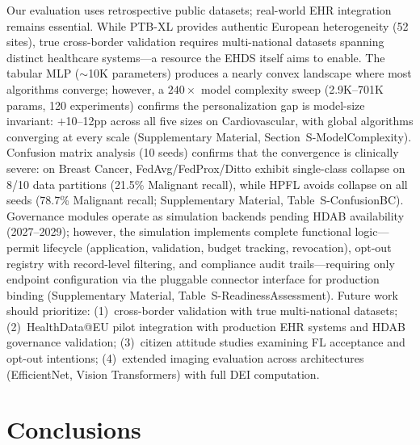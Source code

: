 \documentclass[conference]{IEEEtran}
\begin{document}
Our evaluation uses retrospective public datasets; real-world EHR integration remains essential. While PTB-XL provides authentic European heterogeneity (52 sites), true cross-border validation requires multi-national datasets spanning distinct healthcare systems---a resource the EHDS itself aims to enable. The tabular MLP ($\sim$10K parameters) produces a nearly convex landscape where most algorithms converge; however, a $240\times$ model complexity sweep (2.9K--701K params, 120 experiments) confirms the personalization gap is model-size invariant: $+$10--12pp across all five sizes on Cardiovascular, with global algorithms converging at every scale (Supplementary Material, Section~S-ModelComplexity). Confusion matrix analysis (10 seeds) confirms that the convergence is clinically severe: on Breast Cancer, FedAvg/FedProx/Ditto exhibit single-class collapse on 8/10 data partitions (21.5\% Malignant recall), while HPFL avoids collapse on all seeds (78.7\% Malignant recall; Supplementary Material, Table~S-ConfusionBC). Governance modules operate as simulation backends pending HDAB availability (2027--2029); however, the simulation implements complete functional logic---permit lifecycle (application, validation, budget tracking, revocation), opt-out registry with record-level filtering, and compliance audit trails---requiring only endpoint configuration via the pluggable connector interface for production binding (Supplementary Material, Table~S-ReadinessAssessment). Future work should prioritize: (1)~cross-border validation with true multi-national datasets; (2)~HealthData@EU pilot integration with production EHR systems and HDAB governance validation; (3)~citizen attitude studies examining FL acceptance and opt-out intentions; (4)~extended imaging evaluation across architectures (EfficientNet, Vision Transformers) with full DEI computation.

\section{Conclusions}
\label{sec:conclusions}
\end{document}
